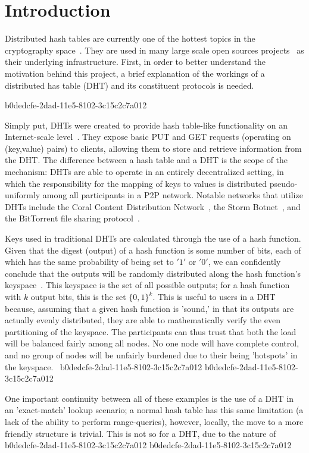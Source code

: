 \documentclass[12pt]{article}
\begin{document}
\section{Introduction}
\par Distributed hash tables are currently one of the hottest topics in the cryptography space~\cite{Stoica:2001dj,Rowstron:2001ea,Ratnasamy:2001wn}. They are used in many large scale open sources projects~\cite{Freitas:2013tb,Xu:2010vs,Perfitt:2010fh} as their underlying infrastructure. First, in order to better understand the motivation behind this project, a brief explanation of the workings of a distributed has table (DHT) and its constituent protocols is needed.

b0dedcfe-2dad-11e5-8102-3c15c2c7a012\par Simply put, DHTs were created to provide hash table-like functionality on an Internet-scale level~\cite{Ratnasamy:2001wn}. They expose basic PUT and GET requests (operating on (key,value) pairs) to clients, allowing them to store and retrieve information from the DHT. The difference between a hash table and a DHT is the scope of the mechanism: DHTs are able to operate in an entirely decentralized setting, in which the responsibility for the mapping of keys to values is distributed pseudo-uniformly among all participants in a P2P network. Notable networks that utilize DHTs include the Coral Content Distribution Network~\cite{Freedman:2004vb}, the Storm Botnet~\cite{Holz:2008uk}, and the BitTorrent file sharing protocol~\cite{Cohen:y1_8mBnw}.

\par Keys used in traditional DHTs are calculated through the use of a hash function. Given that the digest (output) of a hash function is some number of bits, each of which has the same probability of being set to $'1'$ or $'0'$, we can confidently conclude that the outputs will be randomly distributed along the hash function's keyspace~. This keyspace is the set of all possible outputs; for a hash function with $k$ output bits, this is the set $\{0,1\}^k$. This is useful to users in a DHT because, assuming that a given hash function is 'sound,' in that its outputs are actually evenly distributed, they are able to mathematically verify the even partitioning of the keyspace. The participants can thus trust that both the load will be balanced fairly among all nodes. No one node will have complete control, and no group of nodes will be unfairly burdened due to their being 'hotspots' in the keyspace.~
b0dedcfe-2dad-11e5-8102-3c15c2c7a012
b0dedcfe-2dad-11e5-8102-3c15c2c7a012\par One important continuity between all of these examples is the use of a DHT in an 'exact-match' lookup scenario; a normal hash table has this same limitation (a lack of the ability to perform range-queries), however, locally, the move to a more friendly structure is trivial. This is not so for a DHT, due to the nature of
b0dedcfe-2dad-11e5-8102-3c15c2c7a012\printbibliography
b0dedcfe-2dad-11e5-8102-3c15c2c7a012
\end{document}

